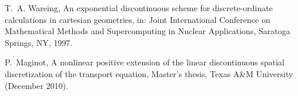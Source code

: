 \documentclass[xchauthor,chkrefs,fixeqskip,GCNS,amsmath,amsthm]{yjcphg}
\theoremstyle{remark}
\begin{document}
\begin{backmatter}
\begin{thebibliography}{}
\begin{bsubitem}
\begin{bcontribution}%
\end{bcontribution}
\begin{bhost}
\begin{beditedbook}
\end{beditedbook}
\end{bhost}
\end{bsubitem}
%
\OrigBibText
T.~A. Wareing, An exponential discontinuous scheme for discrete-ordinate
calculations in cartesian geometries, in: Joint International Conference
on Mathematical Methods and Supercomputing in Nuclear Applications,
Saratoga Springs, NY, 1997.
\endOrigBibText
{}%
\endbibitem

\begin{bsubitem}
\begin{bcontribution}%
\end{bcontribution}
\prnsep{,\ }
\begin{bhost}
\begin{bbook}[class=report]
\end{bbook}
\end{bhost}
\end{bsubitem}
%
\OrigBibText
P.~Maginot, A nonlinear positive extension of the linear discontinuous
spatial discretization of the transport equation, Master's thesis, Texas
A\&M University (December 2010).
\endOrigBibText
{}%
\endbibitem


\end{thebibliography}
\end{backmatter}
\end{document}
